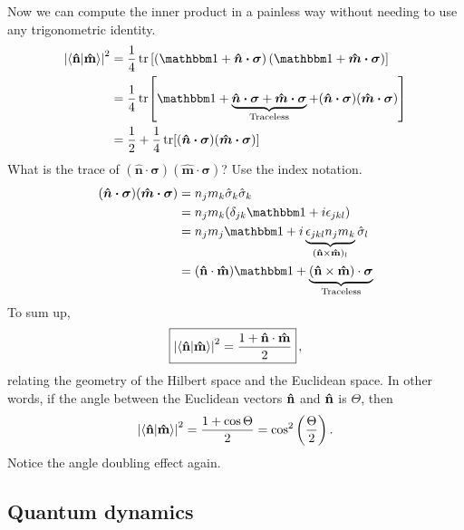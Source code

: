 \noindent Now we can compute the inner product in a painless way without needing to use any trigonometric identity.
\begin{align}
	\abs{\ip{\bf \hat n}{\bf \hat m}}^2 &= \frac{1}{4}\tr
	\left[ \left(\id + \boldsymbol{\hat n\cdot\sigma}\right) \left(\id + \boldsymbol{\hat m\cdot\sigma}\right) 
	\right] \\
	&= \frac{1}{4}\tr[ \id +  \underbrace{\boldsymbol{\hat n\cdot\sigma} + \boldsymbol{\hat m\cdot\sigma}}_{\textrm{Traceless}} + (\boldsymbol{\hat n\cdot\sigma})(\boldsymbol{\hat m\cdot\sigma})] \\
	&= \frac{1}{2} + \frac{1}{4}\tr[(\boldsymbol{\hat n\cdot\sigma})(\boldsymbol{\hat m\cdot\sigma})]
\end{align}
What is the trace of $(\boldsymbol{\hat n\cdot\sigma})(\boldsymbol{\hat m\cdot\sigma})$? Use the index notation.
\begin{align}
	(\boldsymbol{\hat n\cdot\sigma})(\boldsymbol{\hat m\cdot\sigma}) &= n_j m_k \hat\sigma_k \hat\sigma_k \\
	&= n_jm_k (\delta_{jk}\id + i\epsilon_{jkl}) \\
	&= n_jm_j\id + i\underbrace{\epsilon_{jkl}n_jm_k}_{({\bf \hat n \times \hat m})_l} \hat\sigma_l \\
	&= ({\bf \hat n \cdot \hat m})\id + \underbrace{({\bf \hat n \times \hat m}) \cdot \boldsymbol{\sigma}}_{\textrm{Traceless}}
\end{align}
To sum up,
\begin{align}
	\boxed{\abs{\ip{\bf \hat n}{\bf \hat m}}^2 = \frac{1+{\bf \hat n \cdot \hat m}}{2}}\, ,
\end{align}  
relating the geometry of the Hilbert space and the Euclidean space. In other words, if the angle between the Euclidean vectors ${\bf \hat n}$ and ${\bf \hat n}$ is $\Theta$, then
\begin{align} 
	\abs{\ip{\bf \hat n}{\bf \hat m}}^2 = \frac{1+\cos\Theta}{2} = \cos^2\left(\frac{\Theta}{2}\right).
\end{align}                            
Notice the angle doubling effect again.  


\subsection{Quantum dynamics}

